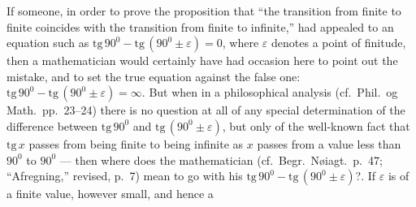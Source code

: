 \documentclass[12pt,a4paper]{book}
\begin{document}
If someone, in order to prove the proposition that ``the transition from finite
to finite coincides with the transition from finite to infinite,'' had appealed
to an equation such as $\mathrm{tg}\,90^{0} - \mathrm{tg}\,(90^{0} \pm
\varepsilon) = 0$, where $\varepsilon$ denotes a point of finitude, then a
mathematician would certainly have had occasion here to point out the mistake,
and to set the true equation against the false one:
$\mathrm{tg}\,90^{0} - \mathrm{tg}\,(90^{0} \pm \varepsilon) = \infty$. But
when in a philosophical analysis (cf.\ Phil.\ og Math.\ pp.~23--24) there is no
question at all of any special determination of the difference between
$\mathrm{tg}\,90^{0}$ and $\mathrm{tg}\,(90^{0} \pm \varepsilon)$, but only of
the well-known fact that $\mathrm{tg}\,x$ passes from being finite to being
infinite as $x$ passes from a
value less than $90^{0}$ to $90^{0}$ --- then where does the mathematician
(cf.\ Begr.\ Nøiagt.\ p.~47; ``Afregning,'' revised, p.~7) mean to go with his
$\mathrm{tg}\,90^{0} - \mathrm{tg}\,(90^{0} \pm \varepsilon)$?. If
$\varepsilon$ is of a finite value, however small, and hence a
\end{document}
